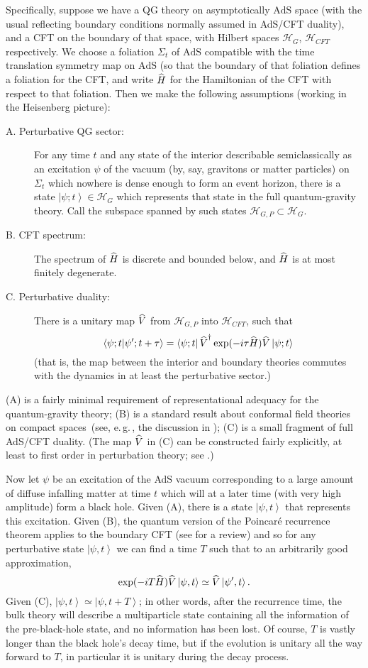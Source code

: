 \documentclass{article}
\newcommand{\AdS}{\mbox{AdS}}
\newcommand{\egc}{\mbox{e.\,g.\,}}
\newcommand{\mc}[1]{\ensuremath{\mathcal{#1}}}
\newcommand{\ket}[1]{\ensuremath{\left|  #1 \right\rangle}}
\newcommand{\bra}[1]{\ensuremath{\left\langle #1 \right|}}
\newcommand{\bk}[2]{\ensuremath{\left\langle #1 | #2 \right\rangle}}
\newcommand{\matel}[3]{\ensuremath{\bra{#1} #2 \ket{#3}}}
\newcommand{\op}[1]{\ensuremath{\widehat{\textsf{\ensuremath{#1}}}}}
\newcommand{\opad}[1]{\ensuremath{\op{#1}^{\dagger}}}
\newcommand{\be}{\begin{equation}}
\newcommand{\ee}{\end{equation}}
\begin{document}
Specifically, suppose we have a QG theory on asymptotically $\AdS$ space (with the usual reflecting boundary conditions normally assumed in AdS/CFT duality), and a CFT on the boundary of that space, with Hilbert spaces $\mc{H}_G$, $\mc{H}_{CFT}$ respectively. We choose a foliation $\Sigma_t$ of $\AdS$ compatible with the time translation symmetry map on $\AdS$ (so that the boundary of that foliation defines a foliation for the CFT, and write $\op{H}$ for the Hamiltonian of the CFT with respect to that foliation. Then we make the following assumptions (working in the Heisenberg picture):
\begin{description}
\item[A. Perturbative QG sector:] For any time $t$ and any state of the interior describable semiclassically as an excitation $\psi$ of the vacuum (by, say, gravitons or matter particles) on $\Sigma_t$ which nowhere is dense enough to form an event horizon, there is a state $\ket{\psi;t}\in\mc{H}_G$ which represents that state in the full quantum-gravity theory. Call the subspace spanned by such states $\mc{H}_{G,P}\subset \mc{H}_G$.
\item[B. CFT spectrum:] The spectrum of \op{H} is discrete and bounded below, and $\op{H}$ is at most finitely degenerate.
\item[C. Perturbative duality:] There is a unitary map $\op{V}$ from $\mc{H}_{G,P}$ into $\mc{H}_{CFT}$, such that 
\be 
\bk{\psi;t}{\psi';t+\tau}=\matel{\psi;t}{\opad{V}\exp(-i \tau \op{H})\op{V}}{\psi;t}
\ee
(that is, the map between the interior and boundary theories commutes with the dynamics in at least the perturbative sector.)
\end{description}
(A) is a fairly minimal requirement of representational adequacy for the quantum-gravity theory; (B) is a standard result about conformal field theories on compact spaces~(see, \egc, the discussion in ); (C) is a small fragment of full AdS/CFT duality. (The map $\op{V}$ in (C) can be constructed fairly explicitly, at least to first order in perturbation theory; see .)

Now let $\psi$ be an excitation of the AdS vacuum corresponding to a large amount of diffuse infalling matter at time $t$ which will at a later time (with very high amplitude) form a black hole. Given (A), there is a state $\ket{\psi,t}$ that represents this excitation.
Given (B), the quantum version of the Poincar\'{e} recurrence theorem applies to the boundary CFT (see  for a review) and so for any perturbative state $\ket{\psi,t}$ we can find a time $T$ such that to an arbitrarily good approximation,
\be
\exp(-i T\op{H})\op{V}\ket{\psi,t}\simeq\op{V}\ket{\psi',t}.
\ee
Given (C), $\ket{\psi,t}\simeq \ket{\psi,t+T}$; in other words, after the recurrence time, the bulk theory will describe a multiparticle state containing all the information of the pre-black-hole state, and no information has been lost. Of course, $T$ is vastly longer than the black hole's decay time, but if the evolution is unitary all the way forward to $T$, in particular it is unitary during the decay process.
\end{document}
